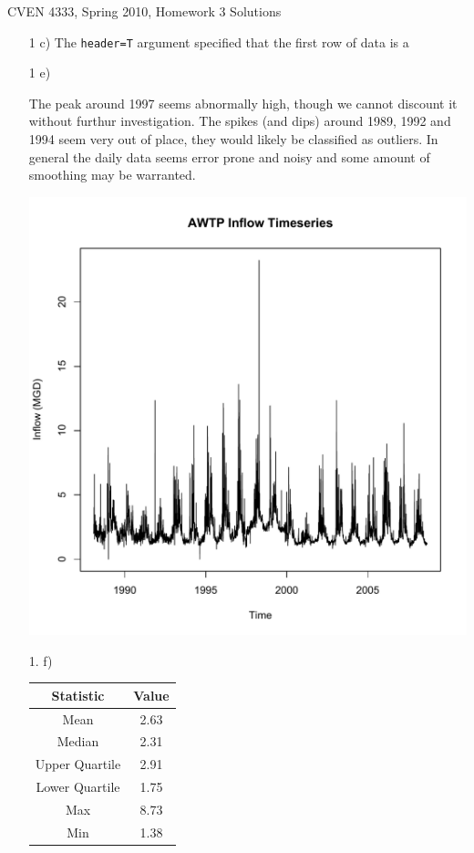 \documentclass[11pt]{article}
\begin{document}
CVEN 4333, Spring 2010, Homework 3 Solutions

\begin{enumerate}
\item[1 c)] The \texttt{header=T} argument specified that the first row of data is a 

\item[1 e)]

The peak around 1997 seems abnormally high, though we cannot discount it without furthur investigation. The spikes (and dips) around 1989, 1992 and 1994 seem very out of place, they would likely be classified as outliers.  In general the daily data seems error prone and noisy and some amount of smoothing may be warranted. 

\includegraphics[width=\textwidth]{inflow.pdf}

\newpage
\item[1. f)]~

\begin{table}[!h]
\centering
\begin{tabular}{cc}
\toprule
Statistic & Value \\
\midrule
Mean & 2.63 \\
Median & 2.31 \\
Upper Quartile  & 2.91 \\
Lower Quartile & 1.75 \\
Max & 8.73 \\
Min & 1.38\\
\bottomrule
\end{tabular}
\end{table}


\end{enumerate}
\end{document}
